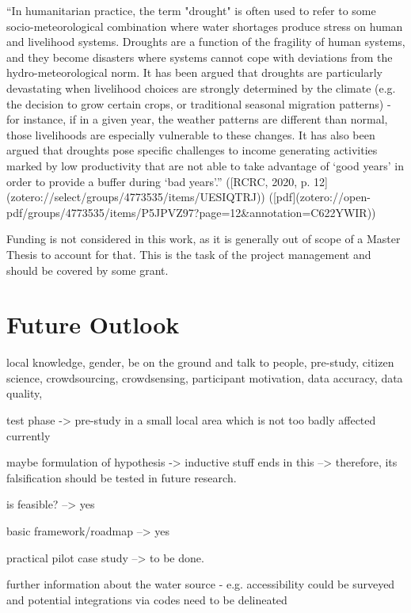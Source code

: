 “In humanitarian practice, the term "drought" is often used to refer to some socio-meteorological combination where water shortages produce stress on human and livelihood systems. Droughts are a function of the fragility of human systems, and they become disasters where systems cannot cope with deviations from the hydro-meteorological norm. It has been argued that droughts are particularly devastating when livelihood choices are strongly determined by the climate (e.g. the decision to grow certain crops, or traditional seasonal migration patterns) - for instance, if in a given year, the weather patterns are different than normal, those livelihoods are especially vulnerable to these changes. It has also been argued that droughts pose specific challenges to income generating activities marked by low productivity that are not able to take advantage of ‘good years’ in order to provide a buffer during ‘bad years’.” ([RCRC, 2020, p. 12](zotero://select/groups/4773535/items/UESIQTRJ)) ([pdf](zotero://open-pdf/groups/4773535/items/P5JPVZ97?page=12&annotation=C622YWIR))


Funding is not considered in this work, as it is generally out of scope of a Master Thesis to account for that. This is the task of the project management and should be covered by some grant.


\section{Future Outlook}

local knowledge, gender, be on the ground and talk to people, pre-study, citizen science, crowdsourcing, crowdsensing, participant motivation, data accuracy, data quality,

test phase -> pre-study in a small local area which is not too badly affected currently 


maybe formulation of hypothesis -> inductive stuff ends in this --> therefore, its falsification should be tested in future research.


is feasible? --> yes

basic framework/roadmap --> yes

practical pilot case study --> to be done.


further information about the water source - e.g. accessibility could be surveyed and potential integrations via codes need to be delineated


